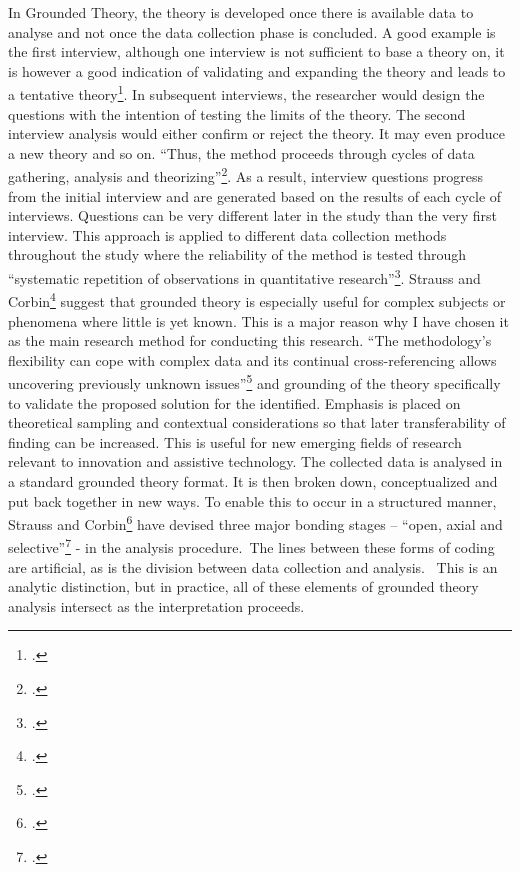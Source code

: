 In Grounded Theory, the theory is developed once there is available data to analyse and not once the data collection phase is concluded. A good example is the first interview, although one interview is not sufficient to base a theory on, it is however a good indication of validating and expanding the theory and leads to a tentative theory\footcite{Cox2008}.
In subsequent interviews, the researcher would design the questions with the intention of testing the limits of the theory. The second interview analysis would either confirm or reject the theory. It may even produce a new theory and so on. ``Thus, the method proceeds through cycles of data gathering, analysis and theorizing''\footcite{Cox2008}. As a result, interview questions progress from the initial interview and are generated based on the results of each cycle of interviews. Questions can be very different later in the study than the very first interview. This approach is applied to different data collection methods throughout the study where the reliability of the method is tested through ``systematic repetition of observations in quantitative research''\footcite{Strauss1990}.
Strauss and Corbin\footcite{Strauss2008} suggest that grounded theory is especially useful for complex subjects or phenomena where little is yet known. This is a major reason why I have chosen it as the main research method for conducting this research. ``The methodology's flexibility can cope with complex data and its continual cross-referencing allows uncovering previously unknown issues''\footcite{Strauss2008} and grounding of the theory specifically to validate the proposed solution for the identified. Emphasis is placed on theoretical sampling and contextual considerations so that later transferability of finding can be increased. 
This is useful for new emerging fields of research relevant to innovation and assistive technology. 
The collected data is analysed in a standard grounded theory format. It is then broken down, conceptualized and put back together in new ways. To enable this to occur in a structured manner, Strauss and Corbin\footcite{Strauss2008} have devised three major bonding stages – ``open, axial and selective''\footcite{Strauss2008} - in the analysis procedure. The lines between these forms of coding are artificial, as is the division between data collection and analysis.  This is an analytic distinction, but in practice, all of these elements of grounded theory analysis intersect as the interpretation proceeds.

